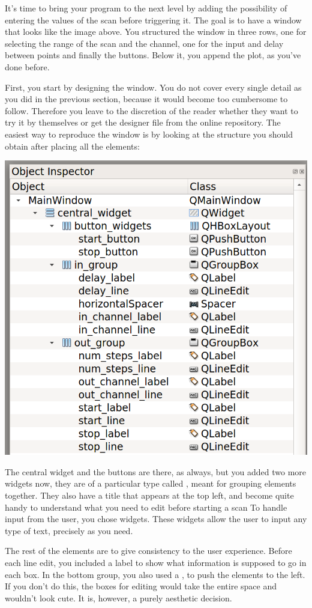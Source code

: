 It's time to bring your program to the next level by adding the possibility of entering the values of the scan before triggering it. The goal is to have a window that looks like the image above. You structured the window in three rows, one for selecting the range of the scan and the channel, one for the input and delay between points and finally the buttons. Below it, you append the plot, as you've done before.

First, you start by designing the window. You do not cover every single detail as you did in the previous section, because it would become too cumbersome to follow. Therefore you leave to the discretion of the reader whether they want to try it by themselves or get the designer file from the online repository. The easiest way to reproduce the window is by looking at the structure you should obtain after placing all the elements:

\begin{center}
    \includegraphics[width=.5\textwidth]{images/Chapter_09/09_final_window_structure.png}
\end{center}

The central widget and the buttons are there, as always, but you added two more widgets now, they are of a particular type called , meant for grouping elements together. They also have a title that appears at the top left, and become quite handy to understand what you need to edit before starting a scan To handle input from the user, you chose  widgets. These widgets allow the user to input any type of text, precisely as you need.

The rest of the elements are to give consistency to the user experience. Before each line edit, you included a label to show what information is supposed to go in each box. In the bottom group, you also used a , to push the elements to the left. If you don't do this, the boxes for editing would take the entire space and wouldn't look cute. It is, however, a purely aesthetic decision.

